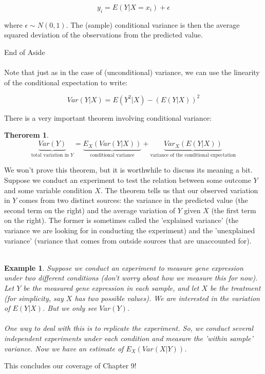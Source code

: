 \documentclass[12pt]{article} %
\newtheorem{example}{Example}
\newtheorem{thm}{Therorem}
\begin{document}
$$y_i = E(Y|X = x_i) + \epsilon$$ 

where $\epsilon \sim N(0,1)$. The (sample) conditional variance is then the average squared deviation of the observations from the predicted value.

End of Aside\\\\

Note that just as in the case of (unconditional) variance, we can use the linearity of the conditional expectation to write:

$$Var(Y|X) = E(Y^2|X) - \left(E(Y|X)\right)^2$$

There is a very important theorem involving conditional variance:

\begin{thm}
$$\underbrace{Var(Y)}_{\textrm{total variation in }Y} = \underbrace{E_X(Var(Y|X))}_{\textrm{conditional variance}} + \underbrace{Var_X(E(Y|X))}_{\textrm{variance of the conditional expectation}}$$
\end{thm}

We won't prove this theorem, but it is worthwhile to discuss its meaning a bit. Suppose we conduct an experiment to test the relation between some outcome $Y$ and some variable condition $X$. The theorem tells us that our observed variation in $Y$ comes from two distinct sources: the variance in the predicted value (the second term on the right) and the average variation of $Y$ given $X$ (the first term on the right). The former is sometimes called the 'explained variance' (the variance we are looking for in conducting the experiment) and the 'unexplained variance' (variance that comes from outside sources that are unaccounted for).\\\\
\begin{example}
Suppose we conduct an experiment to measure gene expression under two different conditions (don't worry about how we measure this for now). Let $Y$ be the measured gene expression in each sample, and let $X$ be the treatment (for simplicity, say $X$ has two possible values). We are interested in the variation of $E(Y|X)$. But we only see $Var(Y)$.\\\\
One way to deal with this is to \emph{replicate} the experiment. So, we conduct several independent experiments under each condition and measure the 'within sample' variance. Now we have an estimate of $E_X(Var(X|Y))$.
\end{example} 

This concludes our coverage of Chapter 9!
\end{document}
